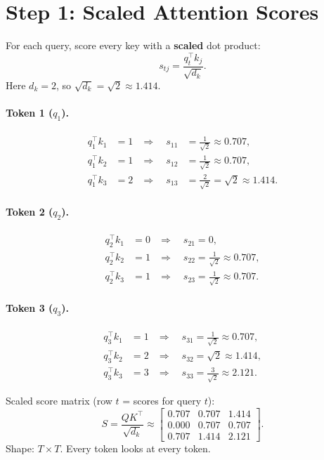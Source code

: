 \documentclass[11pt]{article}
\begin{document}
\section{Step 1: Scaled Attention Scores}

For each query, score every key with a \textbf{scaled} dot product:
\[
  s_{tj}
  =
  \frac{q_t^\top k_j}{\sqrt{d_k}}.
\]
Here \(d_k=2\), so \(\sqrt{d_k}=\sqrt{2}\approx 1.414\).

\paragraph{Token 1 (\(q_1\)).}
\begin{align*}
  q_1^\top k_1 &= 1 &\Rightarrow\quad s_{11} &= \tfrac{1}{\sqrt{2}} \approx 0.707, \\
  q_1^\top k_2 &= 1 &\Rightarrow\quad s_{12} &= \tfrac{1}{\sqrt{2}} \approx 0.707, \\
  q_1^\top k_3 &= 2 &\Rightarrow\quad s_{13} &= \tfrac{2}{\sqrt{2}} = \sqrt{2} \approx 1.414.
\end{align*}

\paragraph{Token 2 (\(q_2\)).}
\begin{align*}
  q_2^\top k_1 &= 0 &\Rightarrow\quad s_{21} = 0, \\
  q_2^\top k_2 &= 1 &\Rightarrow\quad s_{22} = \tfrac{1}{\sqrt{2}} \approx 0.707, \\
  q_2^\top k_3 &= 1 &\Rightarrow\quad s_{23} = \tfrac{1}{\sqrt{2}} \approx 0.707.
\end{align*}

\paragraph{Token 3 (\(q_3\)).}
\begin{align*}
  q_3^\top k_1 &= 1 &\Rightarrow\quad s_{31} = \tfrac{1}{\sqrt{2}} \approx 0.707, \\
  q_3^\top k_2 &= 2 &\Rightarrow\quad s_{32} = \sqrt{2} \approx 1.414, \\
  q_3^\top k_3 &= 3 &\Rightarrow\quad s_{33} = \tfrac{3}{\sqrt{2}} \approx 2.121.
\end{align*}

Scaled score matrix (row \(t\) = scores for query \(t\)):
\[
  S
  =
  \frac{QK^\top}{\sqrt{d_k}}
  \approx
  \begin{bmatrix}
    0.707 & 0.707 & 1.414 \\
    0.000 & 0.707 & 0.707 \\
    0.707 & 1.414 & 2.121
  \end{bmatrix}.
\]
Shape: \(T\times T\). Every token looks at every token.
\end{document}
